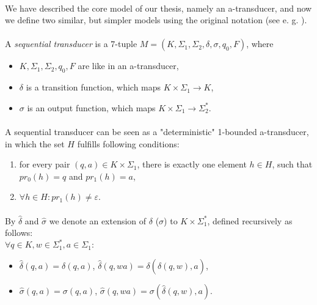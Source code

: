 \paragraph{}
We have described the core model of our thesis, namely an a-transducer, and now we define two similar, but simpler models using the original notation (see e. g. \cite{moh:min}).

\paragraph{}
 A \emph{sequential transducer} is a 7-tuple $M=(K, \Sigma_{1}, \Sigma_{2}, \delta, \sigma, q_{0}, F)$, where
\begin{itemize} 
\item $K, \Sigma_{1}, \Sigma_{2}, q_{0}, F$ are like in an a-transducer,
\item $\delta $ is a transition function, which maps $K \times \Sigma_{1} \rightarrow K$,
\item $\sigma $ is an output function, which maps $K \times \Sigma_{1} \rightarrow \Sigma_{2}^{*} $.
\end{itemize}

\paragraph{} 
A sequential transducer can be seen as a "deterministic" 1-bounded a-transducer, in which the set $H$ fulfills following conditions:
\begin{enumerate}
\item for every pair $(q, a) \in K \times \Sigma_{1}$, there is exactly one element $h \in H$, such that $pr_{0}(h) = q$ and $pr_{1}(h) = a$,
\item $\forall h \in H: pr_{1}(h) \neq \varepsilon$.
\end{enumerate}

\paragraph{}
\oznacenie By $\hat{\delta}$ and $\hat{\sigma}$ we denote an extension of $\delta $ ($\sigma $) to $K \times \Sigma_{1}^{*} $, defined recursively as follows: \\
$\forall q \in K, w \in \Sigma_{1}^{*}, a \in \Sigma_{1}:$ \\
\begin{itemize} 
\item $\hat{\delta}(q, a) = \delta (q,a)$, $\hat{\delta}(q,wa) = \delta (\hat{\delta}(q, w), a)$,
\item $\hat{\sigma}(q, a) = \sigma (q,a)$, $\hat{\sigma}(q,wa) = \sigma (\hat{\delta}(q, w), a)$.
\end{itemize}

